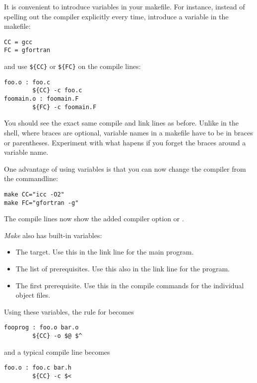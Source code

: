 It is convenient to introduce variables in your makefile.
For instance, 
instead of spelling out the compiler explicitly every time, introduce a
variable in the makefile:
\begin{verbatim}
CC = gcc
FC = gfortran
\end{verbatim}
and use \verb+${CC}+ or \verb+${FC}+ on the compile lines:
\begin{verbatim}
foo.o : foo.c
        ${CC} -c foo.c
foomain.o : foomain.F
        ${FC} -c foomain.F
\end{verbatim}
  {You should see the exact same compile and link lines as before.}
  {Unlike in the shell, where braces are optional, variable names in a
    makefile have to be in
    braces or parentheses. Experiment with what hapens if you forget
    the braces around a variable name.}

One
advantage of using variables is that you can now change the compiler
from the commandline:
\begin{verbatim}
make CC="icc -O2"
make FC="gfortran -g"
\end{verbatim}

  {The compile lines now show the added compiler option  or .}{}

\emph{Make} also has built-in variables:
\begin{itemize}
\item [\n{\$@}] The target. Use this in the link line for the main
  program. %
\item [\n{\$\char`\^}] The list of prerequisites. Use this also in the link
  line for the program.
\item [\n{\$<}] The first prerequisite. Use this in the compile
  commands for the individual object files.
\end{itemize}
Using these variables, the rule for  becomes
\begin{verbatim}
fooprog : foo.o bar.o
        ${CC} -o $@ $^
\end{verbatim}
and a typical compile line becomes
\begin{verbatim}
foo.o : foo.c bar.h
        ${CC} -c $<
\end{verbatim}

